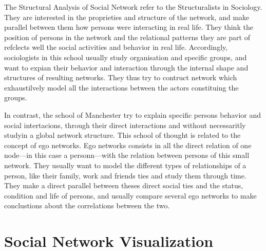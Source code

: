 The Structural Analysis of Social Network refer to the Structuralists in Sociology. They are interested in the proprieties and structure of the network, and make parallel between them how persons were interacting in real life. They think the position of persons in the network and the relational patterns they are part of refclects well the  social activities and behavior in real life. Accordingly, sociologists in this school usually study organisation and specific groups, and want to expian their behavior and interaction through the internal shape and structures of resulting networks. They thus try to contruct network which exhaustilvely model all the interactions between the actors constituing the groups.

In contrast, the school of Manchester try to explain specific persons behavior and social intertacions, through their direct interactions and without necessaritly studyin a global network structure. This school of thought is related to the concept of ego networks. Ego networks consists in all the direct relation of one node---in this case a personn---with the relation between persons of this small network. They usually want to model the different types of relationships of a person, like their family, work and friends ties and study them through time. They make a direct parallel between theses direct social ties and the status, condition and life of persons, and usually compare several ego networks to make conclustions about the correlations between the two.



\section{Social Network Visualization}




